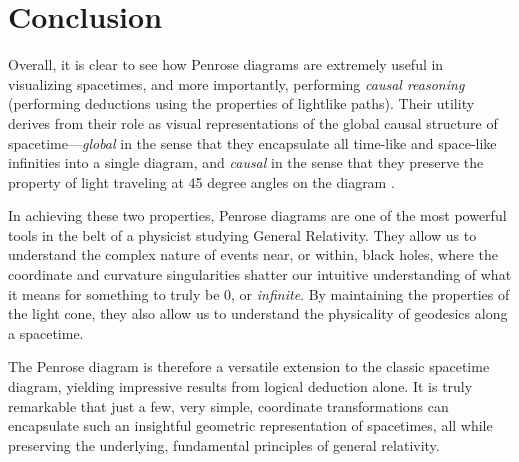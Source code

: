\documentclass{article}
\begin{document}
\section{Conclusion}

Overall, it is clear to see how Penrose diagrams are extremely useful in visualizing spacetimes, and more importantly, performing \textit{causal reasoning} (performing deductions using the properties of lightlike paths). Their utility derives from their role as visual representations of the global causal structure of spacetime---\textit{global} in the sense that they encapsulate all time-like and space-like infinities into a single diagram, and \textit{causal} in the sense that they preserve the property of light traveling at 45 degree angles on the diagram \cite{penrose_colorado}\cite{Dafermos_2005}. 

In achieving these two properties, Penrose diagrams are one of the most powerful tools in the belt of a physicist studying General Relativity. They allow us to understand the complex nature of events near, or within, black holes, where the coordinate and curvature singularities shatter our intuitive understanding of what it means for something to truly be $0$, or \textit{infinite}. By maintaining the properties of the light cone, they also allow us to understand the physicality of geodesics along a spacetime.

The Penrose diagram is therefore a versatile extension to the classic spacetime diagram, yielding impressive results from logical deduction alone. It is truly remarkable that just a few, very simple, coordinate transformations can encapsulate such an insightful geometric representation of spacetimes, all while preserving the underlying, fundamental principles of general relativity.

\printbibliography
\end{document}
